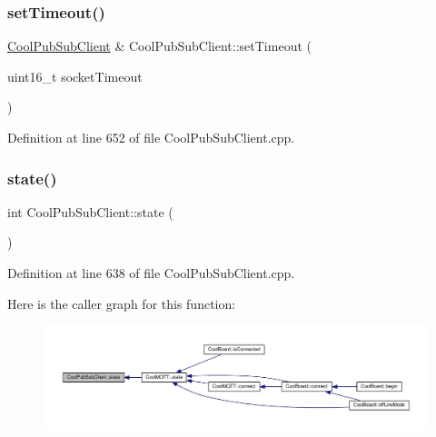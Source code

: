 \subsubsection{\texorpdfstring{set\+Timeout()}{setTimeout()}}
{\footnotesize\ttfamily \hyperlink{class_cool_pub_sub_client}{Cool\+Pub\+Sub\+Client} \& Cool\+Pub\+Sub\+Client\+::set\+Timeout (\begin{DoxyParamCaption}\item[{uint16\+\_\+t}]{socket\+Timeout }\end{DoxyParamCaption})}



Definition at line 652 of file Cool\+Pub\+Sub\+Client.\+cpp.

\mbox{\label{class_cool_pub_sub_client_a3245a5afc6d22e61270dcfe392ccb866}} 
\subsubsection{\texorpdfstring{state()}{state()}}
{\footnotesize\ttfamily int Cool\+Pub\+Sub\+Client\+::state (\begin{DoxyParamCaption}{ }\end{DoxyParamCaption})}



Definition at line 638 of file Cool\+Pub\+Sub\+Client.\+cpp.

Here is the caller graph for this function\+:\nopagebreak
\begin{figure}[H]
\begin{center}
\leavevmode
\includegraphics[width=350pt]{class_cool_pub_sub_client_a3245a5afc6d22e61270dcfe392ccb866_icgraph}
\end{center}
\end{figure}
\mbox{\label{class_cool_pub_sub_client_ac1ebc9ad874128aefa985d78496d2e8f}} 
